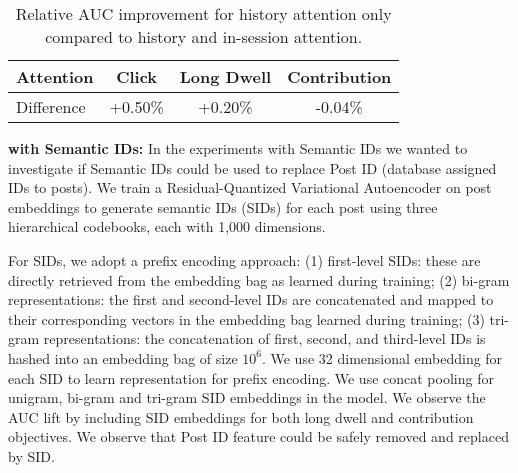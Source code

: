 \begin{table}[h]
\centering
\small
\begin{tabular}{l c c c}
\hline
\textbf{Attention} & \textbf{Click} & \textbf{Long Dwell} & \textbf{Contribution} \\
\hline
Difference & +0.50\% & +0.20\% & -0.04\% \\
\hline
\end{tabular}
\caption{Relative AUC improvement for history attention only compared to history and in-session attention.}
\label{tab:attention_metrics_table}
\end{table}


\textbf{{\systemname} with Semantic IDs:} In the experiments with Semantic IDs we wanted to investigate if Semantic IDs could be used to replace Post ID (database assigned IDs to posts). We train a Residual-Quantized Variational Autoencoder on post embeddings to generate semantic IDs (SIDs) for each post using three hierarchical codebooks, each with 1,000 dimensions. 

For SIDs, we adopt a prefix encoding approach: (1) first-level SIDs: these are directly retrieved from the embedding bag as learned during training; (2) bi-gram representations: the first and second-level IDs are concatenated and mapped to their corresponding vectors in the embedding bag learned during training; (3) tri-gram representations: the concatenation of first, second, and third-level IDs is hashed into an embedding bag of size $10^{6}$. We use 32 dimensional embedding for each SID to learn representation for prefix encoding. We use concat pooling for unigram, bi-gram and tri-gram SID embeddings in the {\systemname} model. We observe the AUC lift by including SID embeddings for both long dwell and contribution objectives. We observe that Post ID feature could be safely removed and replaced by SID.




